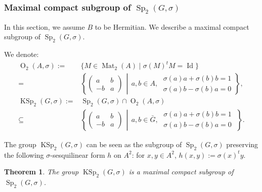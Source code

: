 \documentclass[a4paper,oneside,11pt]{amsart}
\DeclareMathOperator{\Id}{Id}
\DeclareMathOperator{\Mat}{Mat}
\DeclareMathOperator{\Sp}{Sp}
\DeclareMathOperator{\OO}{O}
\DeclareMathOperator{\KSp}{KSp}
\newcommand{\midwd}{\,\middle\vert\,}
\theoremstyle{plain}
\newtheorem{teo}{Theorem}[section]
\theoremstyle{definition}
\theoremstyle{remark}
\begin{document}
\subsubsection{Maximal compact subgroup of \texorpdfstring{$\Sp_2(G,\sigma)$}{Sp2(G,sigma)}}\label{Max_Comp_R}

In this section, we assume $B$ to be Hermitian. We describe a maximal compact subgroup of $\Sp_2(G,\sigma)$.

We denote:
\begin{align*}
\OO_2(A,\sigma):=&\{M\in\Mat_2(A)\mid \sigma(M)^tM=\Id\}\\
=&\left\{\begin{pmatrix}
a & b \\
-b & a
\end{pmatrix}\midwd a,b\in A,\;\begin{matrix}
\sigma(a)a+\sigma(b)b=1\\
\sigma(a)b-\sigma(b)a=0
\end{matrix}\right\},\\
\KSp_2(G,\sigma):=&\Sp_2(G,\sigma)\cap\OO_2(A,\sigma)\\
\subseteq &\left\{\begin{pmatrix}
a & b \\
-b & a
\end{pmatrix}\midwd a,b\in\bar G,\;\begin{matrix}
\sigma(a)a+\sigma(b)b=1\\
\sigma(a)b-\sigma(b)a=0
\end{matrix}\;\right\}.    
\end{align*}

The group $\KSp_2(G,\sigma)$ can be seen as the subgroup of $\Sp_2(G,\sigma)$ preserving the following $\sigma$-sesquilinear form $h$ on $A^2$: for $x,y\in A^2$, $h(x,y):=\sigma(x)^ty$.


\begin{teo}\label{maxcomp-Sp_R}
The group $\KSp_2(G,\sigma)$ is a maximal compact subgroup of $\Sp_2(G,\sigma)$.
\end{teo}
\end{document}
